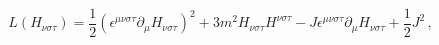 \begin{equation}
L(H_{\nu \sigma \tau })=\frac{1}{2}\left( \epsilon ^{\mu \nu \sigma \tau
}\partial _{\mu }H_{\nu \sigma \tau }\right) ^{2}+3m^{2}H_{\nu \sigma \tau
}H^{\nu \sigma \tau }-J\epsilon ^{\mu \nu \sigma \tau }\partial _{\mu
}H_{\nu \sigma \tau }+\frac{1}{2}J^{2}\,,  \label{lhh}
\end{equation}%
